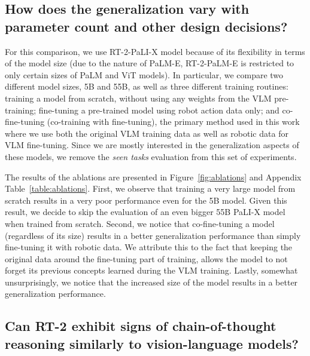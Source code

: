 \documentclass[11pt, a4paper, logo, copyright]{deepmind}
\newcommand{\methodname}{RT-2\xspace}
\begin{document}
\subsection{How does the generalization vary with parameter count and other design decisions?} \label{sec:ablations}

For this comparison, we use \methodname-PaLI-X model because of its flexibility in terms of the model size (due to the nature of PaLM-E, \methodname-PaLM-E is restricted to only certain sizes of PaLM and ViT models). In particular, we compare two different model sizes, 5B and 55B, as well as three different training routines: training a model from scratch, without using any weights from the VLM pre-training; fine-tuning a pre-trained model using robot action data only; and co-fine-tuning (co-training with fine-tuning), the primary method used in this work where we use both the original VLM training data as well as robotic data for VLM fine-tuning. Since we are mostly interested in the generalization aspects of these models, we remove the \textit{seen tasks} evaluation from this set of experiments.

The results of the ablations are presented in Figure~\ref{fig:ablations} and Appendix Table~\ref{table:ablations}. First, we observe that training a very large model from scratch results in a very poor performance even for the 5B model. Given this result, we decide to skip the evaluation of an even bigger 55B PaLI-X model when trained from scratch. Second, we notice that co-fine-tuning a model (regardless of its size) results in a better generalization performance than simply fine-tuning it with robotic data. We attribute this to the fact that keeping the original data around the fine-tuning part of training, allows the model to not forget its previous concepts learned during the VLM training. Lastly, somewhat unsurprisingly, we notice that the increased size of the model results in a better generalization performance.
















\subsection{Can \methodname exhibit signs of chain-of-thought reasoning similarly to vision-language models?}
\label{sec:cot}
\end{document}
